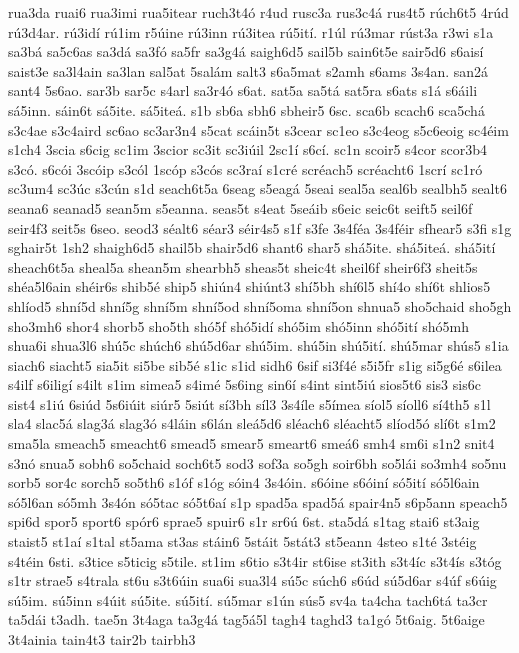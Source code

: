 {rua3da
ruai6
rua3imi
rua5itear
ruch3t4ó
r4ud
rusc3a
rus3c4á
rus4t5
rúch6t5
4rúd
rú3d4ar.
rú3idí
rú1im
r5úine
rú3inn
rú3itea
rú5ití.
r1úl
rú3mar
rúst3a
r3wi
s1a
sa3bá
sa5c6as
sa3dá
sa3fó
sa5fr
sa3g4á
saigh6d5
sail5b
sain6t5e
sair5d6
s6aisí
saist3e
sa3l4ain
sa3lan
sal5at
5salám
salt3
s6a5mat
s2amh
s6ams
3s4an.
san2á
sant4
5s6ao.
sar3b
sar5c
s4arl
sa3r4ó
s6at.
sat5a
sa5tá
sat5ra
s6ats
s1á
s6áili
sá5inn.
sáin6t
sá5ite.
sá5iteá.
s1b
sb6a
sbh6
sbheir5
6sc.
sca6b
scach6
sca5chá
s3c4ae
s3c4aird
sc6ao
sc3ar3n4
s5cat
scáin5t
s3cear
sc1eo
s3c4eog
s5c6eoig
sc4éim
s1ch4
3scia
s6cig
sc1im
3scior
sc3it
sc3iúil
2sc1í
s6cí.
sc1n
scoir5
s4cor
scor3b4
s3có.
s6cói
3scóip
s3cól
1scóp
s3cós
sc3raí
s1cré
scréach5
scréacht6
1scrí
sc1ró
sc3um4
sc3úc
s3cún
s1d
seach6t5a
6seag
s5eagá
5seai
seal5a
seal6b
sealbh5
sealt6
seana6
seanad5
sean5m
s5eanna.
seas5t
s4eat
5seáib
s6eic
seic6t
seift5
seil6f
seir4f3
seit5s
6seo.
seod3
séalt6
séar3
séir4s5
s1f
s3fe
3s4féa
3s4féir
sfhear5
s3fi
s1g
sghair5t
1sh2
shaigh6d5
shail5b
shair5d6
shant6
shar5
shá5ite.
shá5iteá.
shá5ití
sheach6t5a
sheal5a
shean5m
shearbh5
sheas5t
sheic4t
sheil6f
sheir6f3
sheit5s
shéa5l6ain
shéir6s
shib5é
ship5
shiún4
shiúnt3
shí5bh
shí6l5
shí4o
shí6t
shlios5
shlíod5
shní5d
shní5g
shní5m
shní5od
shní5oma
shní5on
shnua5
sho5chaid
sho5gh
sho3mh6
shor4
shorb5
sho5th
shó5f
shó5idí
shó5im
shó5inn
shó5ití
shó5mh
shua6i
shua3l6
shú5c
shúch6
shú5d6ar
shú5im.
shú5in
shú5ití.
shú5mar
shús5
s1ia
siach6
siacht5
sia5it
si5be
sib5é
s1ic
s1id
sidh6
6sif
si3f4é
s5i5fr
s1ig
si5g6é
s6ilea
s4ilf
s6iligí
s4ilt
s1im
simea5
s4imé
5s6ing
sin6í
s4int
sint5iú
sios5t6
sis3
sis6c
sist4
s1iú
6siúd
5s6iúit
siúr5
5siút
sí3bh
síl3
3s4íle
s5ímea
síol5
síoll6
sí4th5
s1l
sla4
slac5á
slag3á
slag3ó
s4láin
s6lán
sleá5d6
sléach6
sléacht5
slíod5ó
slí6t
s1m2
sma5la
smeach5
smeacht6
smead5
smear5
smeart6
smeá6
smh4
sm6i
s1n2
snit4
s3nó
snua5
sobh6
so5chaid
soch6t5
sod3
sof3a
so5gh
soir6bh
so5lái
so3mh4
so5nu
sorb5
sor4c
sorch5
so5th6
s1óf
s1óg
sóin4
3s4óin.
s6óine
s6óiní
só5ití
só5l6ain
só5l6an
só5mh
3s4ón
só5tac
só5t6aí
s1p
spad5a
spad5á
spair4n5
s6p5ann
speach5
spi6d
spor5
sport6
spór6
sprae5
spuir6
s1r
sr6ú
6st.
sta5dá
s1tag
stai6
st3aig
staist5
st1aí
s1tal
st5ama
st3as
stáin6
5stáit
5stát3
st5eann
4steo
s1té
3stéig
s4téin
6sti.
s3tice
s5ticig
s5tile.
st1im
s6tio
s3t4ir
st6ise
st3ith
s3t4íc
s3t4ís
s3tóg
s1tr
strae5
s4trala
st6u
s3t6úin
sua6i
sua3l4
sú5c
súch6
s6úd
sú5d6ar
s4úf
s6úig
sú5im.
sú5inn
s4úit
sú5ite.
sú5ití.
sú5mar
s1ún
sús5
sv4a
ta4cha
tach6tá
ta3cr
ta5dái
t3adh.
tae5n
3t4aga
ta3g4á
tag5á5l
tagh4
taghd3
ta1gó
5t6aig.
5t6aige
3t4ainia
tain4t3
tair2b
tairbh3
}
